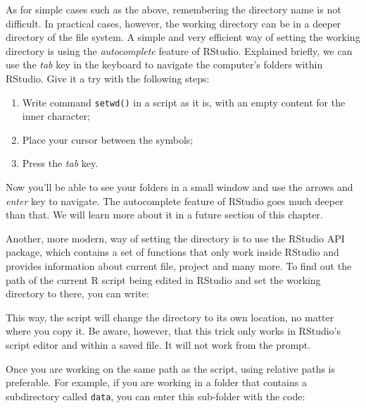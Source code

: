 \documentclass[
  12pt,
]{book}
\newenvironment{Shaded}{\begin{snugshade}}{\end{snugshade}}
\newcommand{\KeywordTok}[1]{\textcolor[rgb]{0.27,0.27,0.27}{\textbf{#1}}}
\newcommand{\NormalTok}[1]{#1}
\newcommand{\OperatorTok}[1]{\textcolor[rgb]{0.43,0.43,0.43}{\textbf{#1}}}
\newcommand{\StringTok}[1]{\textcolor[rgb]{0.5,0.5,0.5}{#1}}
\begin{document}
As for simple cases such as the above, remembering the directory name is not difficult. In practical cases, however, the working directory can be in a deeper directory of the file system. A simple and very efficient way of setting the working directory is using the \emph{autocomplete} feature of RStudio. Explained briefly, we can use the \emph{tab} key in the keyboard to navigate the computer's folders within RStudio. Give it a try with the following steps:

\begin{enumerate}
\def\labelenumi{\arabic{enumi})}
\item
  Write command \texttt{setwd(\textquotesingle{}\textquotesingle{})} in a script as it is, with an empty content for the inner character;
\item
  Place your cursor between the \texttt{\textquotesingle{}} symbols;
\item
  Press the \emph{tab} key.
\end{enumerate}

Now you'll be able to see your folders in a small window and use the arrows and \emph{enter} key to navigate. The autocomplete feature of RStudio goes much deeper than that. We will learn more about it in a future section of this chapter.

Another, more modern, way of setting the directory is to use the RStudio API package, which contains a set of functions that only work inside RStudio and provides information about current file, project and many more. To find out the path of the current R script being edited in RStudio and set the working directory to there, you can write:

\begin{Shaded}
\end{Shaded}

This way, the script will change the directory to its own location, no matter where you copy it. Be aware, however, that this trick only works in RStudio's script editor and within a saved file. It will not work from the prompt.

Once you are working on the same path as the script, using relative paths is preferable. For example, if you are working in a folder that contains a subdirectory called \texttt{data}, you can enter this sub-folder with the code:
\end{document}
